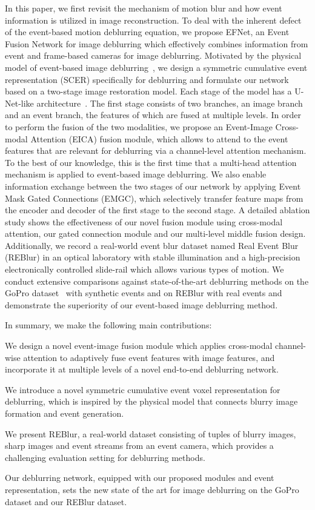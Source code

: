 \documentclass[runningheads]{llncs}
\newlength \g
\begin{document}
In this paper, we first revisit the mechanism of motion blur and how event information is utilized in image reconstruction. To deal with the inherent defect of the event-based motion deblurring equation, we propose EFNet, an Event Fusion Network for image deblurring which effectively combines information from event and frame-based cameras for image deblurring. Motivated by the physical model of event-based image deblurring~\cite{pan2019bringing_high_framerate}, we design a symmetric cumulative event representation (SCER) specifically for deblurring and formulate our network based on a two-stage image restoration model. Each stage of the model has a U-Net-like architecture~\cite{ronneberger2015u}. The first stage consists of two branches, an image branch and an event branch, the features of which are fused at multiple levels. In order to perform the fusion of the two modalities, we propose an Event-Image Cross-modal Attention (EICA) fusion module, which allows to attend to the event features that are relevant for deblurring via a channel-level attention mechanism. To the best of our knowledge, this is the first time that a multi-head attention mechanism is applied to event-based image deblurring. We also enable information exchange between the two stages of our network by applying Event Mask Gated Connections (EMGC), which selectively transfer feature maps from the encoder and decoder of the first stage to the second stage. A detailed ablation study shows the effectiveness of our novel fusion module using cross-modal attention, our gated connection module and our multi-level middle fusion design. Additionally, we record a real-world event blur dataset named Real Event Blur (REBlur) in an optical laboratory with stable illumination and a high-precision electronically controlled slide-rail which allows various types of motion. We conduct extensive comparisons against state-of-the-art deblurring methods on the GoPro dataset~\cite{nah2017deep} with synthetic events and on REBlur with real events and demonstrate the superiority of our event-based image deblurring method.


In summary, we make the following main contributions:
\begin{compactitem}
    \item We design a novel event-image fusion module which applies cross-modal channel-wise attention to adaptively fuse event features with image features, and incorporate it at multiple levels of a novel end-to-end deblurring network.
    \item We introduce a novel symmetric cumulative event voxel representation for deblurring, which is inspired by the physical model that connects blurry image formation and event generation.
    \item We present REBlur, a real-world dataset consisting of tuples of blurry images, sharp images and event streams from an event camera, which provides a challenging evaluation setting for deblurring methods.
    \item Our deblurring network, equipped with our proposed modules and event representation, sets the new state of the art for image deblurring on the GoPro dataset and our REBlur dataset.
\end{compactitem}
\end{document}
